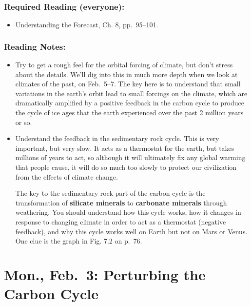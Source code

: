 \documentclass[
]{article}
\providecommand{\tightlist}{%
  \setlength{\itemsep}{0pt}\setlength{\parskip}{0pt}}
\begin{document}
\hypertarget{required-reading-everyone-8}{%
\subsubsection{Required Reading
(everyone):}\label{required-reading-everyone-8}}

\begin{itemize}
\tightlist
\item
  Understanding the Forecast, Ch. 8, pp.~95--101.
\end{itemize}

\hypertarget{reading-notes-8}{%
\subsubsection{Reading Notes:}\label{reading-notes-8}}

\begin{itemize}
\item
  Try to get a rough feel for the orbital forcing of climate, but don't
  stress about the details. We'll dig into this in much more depth when
  we look at climates of the past, on Feb.~5--7. The key here is to
  understand that small variations in the earth's orbit lead to small
  forcings on the climate, which are dramatically amplified by a
  positive feedback in the carbon cycle to produce the cycle of ice ages
  that the earth experienced over the past 2 million years or so.
\item
  Understand the feedback in the sedimentary rock cycle. This is very
  important, but very slow. It acts as a thermostat for the earth, but
  takes millions of years to act, so although it will ultimately fix any
  global warming that people cause, it will do so much too slowly to
  protect our civilization from the effects of climate change.

  The key to the sedimentary rock part of the carbon cycle is the
  transformation of \textbf{silicate minerals} to \textbf{carbonate
  minerals} through weathering. You should understand how this cycle
  works, how it changes in response to changing climate in order to act
  as a thermostat (negative feedback), and why this cycle works well on
  Earth but not on Mars or Venus. One clue is the graph in Fig. 7.2 on
  p.~76.
\end{itemize}

\hypertarget{mon.-feb.-3-perturbing-the-carbon-cycle}{%
\section{Mon., Feb.~3: Perturbing the Carbon
Cycle}\label{mon.-feb.-3-perturbing-the-carbon-cycle}}
\end{document}
